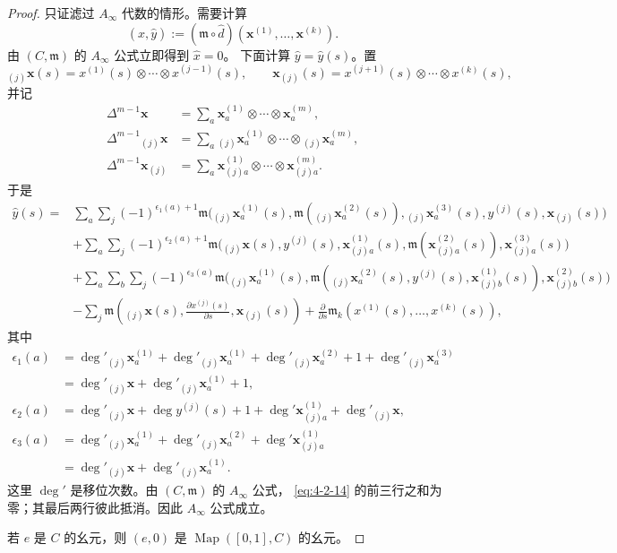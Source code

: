 \begin{proof}
只证滤过 $A_\infty$ 代数的情形。需要计算
\[
 (\widehat x,\widehat y):=(\mathfrak m\circ\widehat d)
 (\mathbf x^{(1)},\ldots,\mathbf x^{(k)}).
\]
由 $(C,\mathfrak m)$ 的 $A_\infty$ 公式立即得到 $\widehat x=0$。
下面计算 $\widehat y=\widehat y(s)$。置
\[
 {}_{(j)}\mathbf x(s)=x^{(1)}(s)\otimes\cdots\otimes x^{(j-1)}(s),
 \qquad
 \mathbf x_{(j)}(s)=x^{(j+1)}(s)\otimes\cdots\otimes x^{(k)}(s),
\]
并记
\[
\begin{aligned}
 \Delta^{m-1}\mathbf x
  &=\sum_a\mathbf x_a^{(1)}\otimes\cdots\otimes\mathbf x_a^{(m)},\\
 \Delta^{m-1}{}_{(j)}\mathbf x
  &=\sum_a{}_{(j)}\mathbf x_a^{(1)}\otimes\cdots\otimes
    {}_{(j)}\mathbf x_a^{(m)},\\
 \Delta^{m-1}\mathbf x_{(j)}
  &=\sum_a\mathbf x_{(j)a}^{(1)}\otimes\cdots\otimes
    \mathbf x_{(j)a}^{(m)}.
\end{aligned}
\]
于是
{\small
\begin{equation}
\begin{aligned}
\widehat y(s)={}&
 \sum_a\sum_j(-1)^{\epsilon_1(a)+1}
 \mathfrak m\bigl({}_{(j)}\mathbf x_a^{(1)}(s),
   \mathfrak m({}_{(j)}\mathbf x_a^{(2)}(s)),
   {}_{(j)}\mathbf x_a^{(3)}(s),y^{(j)}(s),\mathbf x_{(j)}(s)\bigr)\\
&+\sum_a\sum_j(-1)^{\epsilon_2(a)+1}
 \mathfrak m\bigl({}_{(j)}\mathbf x(s),y^{(j)}(s),
   \mathbf x_{(j)a}^{(1)}(s),
   \mathfrak m(\mathbf x_{(j)a}^{(2)}(s)),
   \mathbf x_{(j)a}^{(3)}(s)\bigr)\\
&+\sum_a\sum_b\sum_j(-1)^{\epsilon_3(a)}
 \mathfrak m\bigl({}_{(j)}\mathbf x_a^{(1)}(s),
   \mathfrak m({}_{(j)}\mathbf x_a^{(2)}(s),y^{(j)}(s),
     \mathbf x_{(j)b}^{(1)}(s)),
   \mathbf x_{(j)b}^{(2)}(s)\bigr)\\
&-\sum_j\mathfrak m\left({}_{(j)}\mathbf x(s),
   \frac{\partial x^{(j)}(s)}{\partial s},\mathbf x_{(j)}(s)\right)
 +\frac{\partial}{\partial s}
   \mathfrak m_k(x^{(1)}(s),\ldots,x^{(k)}(s)),
\end{aligned}
\tag{4.2.14}\label{eq:4-2-14}
\end{equation}
}
其中
{\small
\[
\begin{aligned}
 \epsilon_1(a)
  &={}\deg'{}_{(j)}\mathbf x_a^{(1)}
     +\deg'{}_{(j)}\mathbf x_a^{(1)}
     +\deg'{}_{(j)}\mathbf x_a^{(2)}+1
     +\deg'{}_{(j)}\mathbf x_a^{(3)}\\
  &=\deg'{}_{(j)}\mathbf x
     +\deg'{}_{(j)}\mathbf x_a^{(1)}+1,\\
 \epsilon_2(a)
  &=\deg'{}_{(j)}\mathbf x+\deg y^{(j)}(s)+1
     +\deg'\mathbf x_{(j)a}^{(1)}+\deg'{}_{(j)}\mathbf x,\\
 \epsilon_3(a)
  &=\deg'{}_{(j)}\mathbf x_a^{(1)}
    +\deg'{}_{(j)}\mathbf x_a^{(2)}
    +\deg'\mathbf x_{(j)a}^{(1)}\\
  &=\deg'{}_{(j)}\mathbf x
    +\deg'{}_{(j)}\mathbf x_a^{(1)}.
\end{aligned}
\]
}
这里 $\deg'$ 是移位次数。由 $(C,\mathfrak m)$ 的 $A_\infty$ 公式，
\eqref{eq:4-2-14} 的前三行之和为零；其最后两行彼此抵消。因此
$A_\infty$ 公式成立。

若 $e$ 是 $C$ 的幺元，则 $(e,0)$ 是
$\operatorname{Map}([0,1],C)$ 的幺元。
\end{proof}

